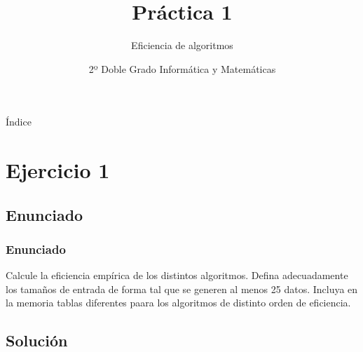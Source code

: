 \documentclass[compress]{beamer}
\title{Práctica 1}                                               %
\subtitle{Eficiencia de algoritmos}                                  %
\date{2º Doble Grado Informática y Matemáticas}                                                            %
\begin{document}
\begin{frame}
\titlepage
\end{frame}

\begin{frame}{Índice}
  \hypertarget{index}{}
  \tableofcontents
  
\end{frame}

\section{Ejercicio 1}
\subsection{Enunciado}
\begin{frame}

\frametitle{Enunciado}
	Calcule  la eficiencia empírica de los distintos algoritmos. Defina adecuadamente los tamaños de entrada de forma tal que se generen al menos 25 datos. Incluya en la memoria tablas diferentes paara los algoritmos de distinto orden de eficiencia.
\end{frame}


\subsection{Solución}

\end{document}
